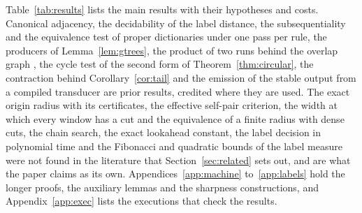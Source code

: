 \documentclass[11pt,a4paper]{article}
\theoremstyle{definition}
\theoremstyle{plain}
\begin{document}
Table~\ref{tab:results} lists the main results with their hypotheses and costs. Canonical adjacency, the decidability of
the label distance, the subsequentiality and the equivalence test of proper dictionaries under one pass per rule, the
producers of Lemma~\ref{lem:gtrees}, the product of two runs behind the overlap graph
\citep[Section~1]{beal1998synchronization}, the cycle test of the second form of Theorem~\ref{thm:circular}, the
contraction behind Corollary~\ref{cor:tail} and the emission of the stable output from a compiled transducer are prior
results, credited where they are used. The exact origin radius with its certificates, the effective self-pair criterion,
the width at which every window has a cut and the equivalence of a finite radius with dense cuts, the chain search, the
exact lookahead constant, the label decision in polynomial time and the Fibonacci and quadratic bounds of the label
measure were not found in the literature that Section~\ref{sec:related} sets out, and are what the paper claims as its
own. Appendices~\ref{app:machine} to~\ref{app:labels} hold the longer proofs, the auxiliary lemmas and the sharpness
constructions, and Appendix~\ref{app:exec} lists the executions that check the results.
\end{document}
